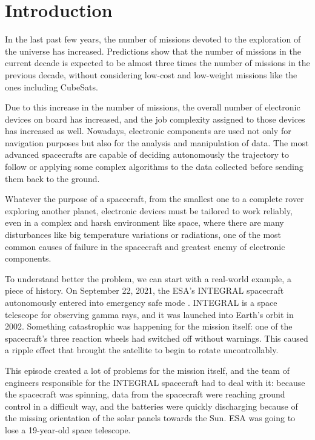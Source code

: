 \nocite{xxx}

\chapter{Introduction}
\label{sec:Introduction}

In the last past few years, the number of missions devoted to the exploration of the universe has increased. Predictions show that the number of missions in the current decade is expected to be almost three times the number of missions in the previous decade, without considering low-cost and low-weight missions like the ones including CubeSats. \bigskip

Due to this increase in the number of missions, the overall number of electronic devices on board has increased, and the job complexity assigned to those devices has increased as well. Nowadays, electronic components are used not only for navigation purposes but also for the analysis and manipulation of data. The most advanced spacecrafts are capable of deciding autonomously the trajectory to follow or applying some complex algorithms to the data collected before sending them back to the ground. \bigskip

Whatever the purpose of a spacecraft, from the smallest one to a complete rover exploring another planet, electronic devices must be tailored to work reliably, even in a complex and harsh environment like space, where there are many disturbances like big temperature variations or radiations, one of the most common causes of failure in the spacecraft and greatest enemy of electronic components. \bigskip

To understand better the problem, we can start with a real-world example, a piece of history. On September 22, 2021, the ESA's INTEGRAL spacecraft autonomously entered into emergency safe mode \cite{ESA:INTEGRAL}. INTEGRAL is a space telescope for observing gamma rays, and it was launched into Earth's orbit in 2002. Something catastrophic was happening for the mission itself: one of the spacecraft's three reaction wheels had switched off without warnings. This caused a ripple effect that brought the satellite to begin to rotate uncontrollably. \bigskip

This episode created a lot of problems for the mission itself, and the team of engineers responsible for the INTEGRAL spacecraft had to deal with it: because the spacecraft was spinning, data from the spacecraft were reaching ground control in a difficult way, and the batteries were quickly discharging because of the missing orientation of the solar panels towards the Sun. ESA was going to lose a 19-year-old space telescope. \bigskip

